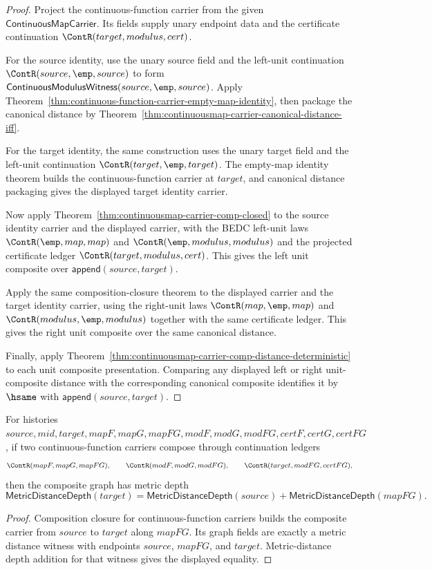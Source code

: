 \begin{proof}
Project the continuous-function carrier from the given
$\mathsf{ContinuousMapCarrier}$. Its fields supply unary endpoint data and the
certificate continuation $\ContR(target,modulus,cert)$.

For the source identity, use the unary source field and the left-unit
continuation $\ContR(source,\emp,source)$ to form
$\mathsf{ContinuousModulusWitness}(source,\emp,source)$. Apply
Theorem~\ref{thm:continuous-function-carrier-empty-map-identity}, then package
the canonical distance by
Theorem~\ref{thm:continuousmap-carrier-canonical-distance-iff}.

For the target identity, the same construction uses the unary target field and
the left-unit continuation $\ContR(target,\emp,target)$. The empty-map identity
theorem builds the continuous-function carrier at $target$, and canonical
distance packaging gives the displayed target identity carrier.

Now apply Theorem~\ref{thm:continuousmap-carrier-comp-closed} to the source
identity carrier and the displayed carrier, with the BEDC left-unit laws
$\ContR(\emp,map,map)$ and $\ContR(\emp,modulus,modulus)$ and the projected
certificate ledger $\ContR(target,modulus,cert)$. This gives the left unit
composite over $\mathsf{append}(source,target)$.

Apply the same composition-closure theorem to the displayed carrier and the
target identity carrier, using the right-unit laws $\ContR(map,\emp,map)$ and
$\ContR(modulus,\emp,modulus)$ together with the same certificate ledger. This
gives the right unit composite over the same canonical distance.

Finally, apply
Theorem~\ref{thm:continuousmap-carrier-comp-distance-deterministic} to each unit
composite presentation. Comparing any displayed left or right unit-composite
distance with the corresponding canonical composite identifies it by $\hsame$
with $\mathsf{append}(source,target)$.
\end{proof}

\begin{theorem}
\label{thm:continuousmap-comp-graph-depth-add}
For histories $source,mid,target,mapF,mapG,mapFG,modF,modG,modFG,certF,certG,certFG$,
if two continuous-function carriers compose through continuation ledgers
$$
\ContR(mapF,mapG,mapFG),\qquad
\ContR(modF,modG,modFG),\qquad
\ContR(target,modFG,certFG),
$$
then the composite graph has metric depth
$$
\mathsf{MetricDistanceDepth}(target)
=
\mathsf{MetricDistanceDepth}(source)+
\mathsf{MetricDistanceDepth}(mapFG).
$$
\end{theorem}
\begin{proof}
Composition closure for continuous-function carriers builds the composite
carrier from $source$ to $target$ along $mapFG$. Its graph fields are exactly a
metric distance witness with endpoints $source$, $mapFG$, and $target$.
Metric-distance depth addition for that witness gives the displayed equality.
\end{proof}

